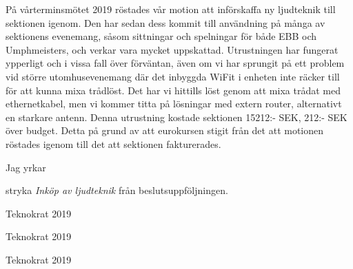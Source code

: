 \documentclass[../_main/handlingar.tex]{subfiles}
\begin{document}

    På vårterminsmötet 2019 röstades vår motion att införskaffa ny ljudteknik till sektionen igenom.
Den har sedan dess kommit till användning på många av sektionens evenemang, såsom sittningar
och spelningar för både EBB och Umphmeisters, och verkar vara mycket uppskattad.
Utrustningen har fungerat ypperligt och i vissa fall över förväntan, även om vi har sprungit på ett
problem vid större utomhusevenemang där det inbyggda WiFit i enheten inte räcker till för att
kunna mixa trådlöst. Det har vi hittills löst genom att mixa trådat med ethernetkabel, men vi
kommer titta på lösningar med extern router, alternativt en starkare antenn.
Denna utrustning kostade sektionen 15212:- SEK, 212:- SEK över budget. Detta på grund av att
eurokursen stigit från det att motionen röstades igenom till det att sektionen fakturerades.

    Jag yrkar 
\begin{attsatser}
    \att stryka \emph{Inköp av ljudteknik} från beslutsuppföljningen.
\end{attsatser}

\begin{signatures}{3}
    \signature{David Karlsson}{Teknokrat 2019}
    \signature{Emil P. Lundh}{Teknokrat 2019}
    \signature{Moa Rönnlund}{Teknokrat 2019}
    
\end{signatures}
\end{document}
